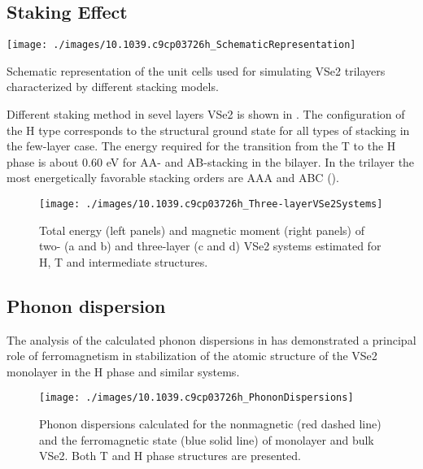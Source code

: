 \subsection{Staking Effect}
\begin{marginfigure}
    \texttt{[image: ./images/10.1039.c9cp03726h\_SchematicRepresentation]}
	\caption[unit cells used for simulating VSe2 trilayers]{
        Schematic representation of the unit cells used for simulating VSe2 trilayers characterized by different stacking models.
	}
\end{marginfigure}

Different staking method in sevel layers VSe2 is shown in . The configuration of the H type corresponds to the structural ground state for all types of stacking in the few-layer case. The energy required for the transition from the T to the H phase is about 0.60 eV for AA- and AB-stacking in the bilayer. In the trilayer the most energetically favorable stacking orders are AAA and ABC ().

\begin{figure}[ht] 
    \texttt{[image: ./images/10.1039.c9cp03726h\_Three-layerVSe2Systems]}
	\caption[Total energy and magnetic moment of two- and three-layer VSe2 systems]{
		Total energy (left panels) and magnetic moment (right panels) of two- (a and b) and three-layer (c and d) VSe2 systems estimated for H, T and intermediate structures.
	}
\end{figure}

\subsection{Phonon dispersion}
The analysis of the calculated phonon dispersions in  has demonstrated a principal role of ferromagnetism in stabilization of the atomic structure of the VSe2 monolayer in the H phase and similar systems.
\begin{figure}[ht] 
    \texttt{[image: ./images/10.1039.c9cp03726h\_PhononDispersions]}
	\caption[Phonon dispersions calculated for the nonmagnetic and the ferromagnetic state of monolayer and bulk VSe2.]{
		Phonon dispersions calculated for the nonmagnetic (red dashed line) and the ferromagnetic state (blue solid line) of monolayer and bulk VSe2. Both T and H phase structures are presented.
	}
\end{figure}
